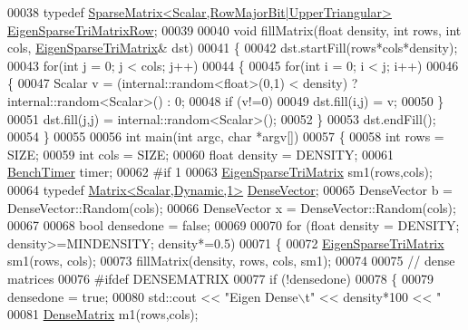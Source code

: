 \begin{DoxyCode}
00038 \textcolor{keyword}{typedef} \hyperlink{group___sparse_core___module_class_eigen_1_1_sparse_matrix}{SparseMatrix<Scalar,RowMajorBit|UpperTriangular>} 
      \hyperlink{group___sparse_core___module_class_eigen_1_1_sparse_matrix}{EigenSparseTriMatrixRow};
00039 
00040 \textcolor{keywordtype}{void} fillMatrix(\textcolor{keywordtype}{float} density, \textcolor{keywordtype}{int} rows, \textcolor{keywordtype}{int} cols,  \hyperlink{group___sparse_core___module_class_eigen_1_1_sparse_matrix}{EigenSparseTriMatrix}& dst)
00041 \{
00042   dst.startFill(rows*cols*density);
00043   \textcolor{keywordflow}{for}(\textcolor{keywordtype}{int} j = 0; j < cols; j++)
00044   \{
00045     \textcolor{keywordflow}{for}(\textcolor{keywordtype}{int} i = 0; i < j; i++)
00046     \{
00047       Scalar v = (internal::random<float>(0,1) < density) ? internal::random<Scalar>() : 0;
00048       \textcolor{keywordflow}{if} (v!=0)
00049         dst.fill(i,j) = v;
00050     \}
00051     dst.fill(j,j) = internal::random<Scalar>();
00052   \}
00053   dst.endFill();
00054 \}
00055 
00056 \textcolor{keywordtype}{int} main(\textcolor{keywordtype}{int} argc, \textcolor{keywordtype}{char} *argv[])
00057 \{
00058   \textcolor{keywordtype}{int} rows = SIZE;
00059   \textcolor{keywordtype}{int} cols = SIZE;
00060   \textcolor{keywordtype}{float} density = DENSITY;
00061   \hyperlink{class_eigen_1_1_bench_timer}{BenchTimer} timer;
00062 \textcolor{preprocessor}{  #if 1}
00063   \hyperlink{group___sparse_core___module_class_eigen_1_1_sparse_matrix}{EigenSparseTriMatrix} sm1(rows,cols);
00064   \textcolor{keyword}{typedef} \hyperlink{group___core___module}{Matrix<Scalar,Dynamic,1>} \hyperlink{group___core___module}{DenseVector};
00065   DenseVector b = DenseVector::Random(cols);
00066   DenseVector x = DenseVector::Random(cols);
00067 
00068   \textcolor{keywordtype}{bool} densedone = \textcolor{keyword}{false};
00069 
00070   \textcolor{keywordflow}{for} (\textcolor{keywordtype}{float} density = DENSITY; density>=MINDENSITY; density*=0.5)
00071   \{
00072     \hyperlink{group___sparse_core___module_class_eigen_1_1_sparse_matrix}{EigenSparseTriMatrix} sm1(rows, cols);
00073     fillMatrix(density, rows, cols, sm1);
00074 
00075     \textcolor{comment}{// dense matrices}
00076 \textcolor{preprocessor}{    #ifdef DENSEMATRIX}
00077     \textcolor{keywordflow}{if} (!densedone)
00078     \{
00079       densedone = \textcolor{keyword}{true};
00080       std::cout << \textcolor{stringliteral}{"Eigen Dense\(\backslash\)t"} << density*100 << \textcolor{stringliteral}{"%
00081       \hyperlink{group___core___module}{DenseMatrix} m1(rows,cols);
}
\end{DoxyCode}
